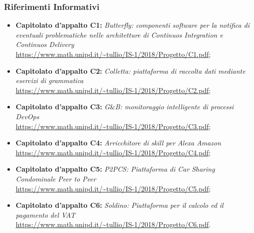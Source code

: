 \subsubsection{Riferimenti Informativi}
\begin{itemize}
	\item \textbf{Capitolato d'appalto C1:} \textit{Butterfly: componenti software per la notifica di eventuali problematiche nelle architetture di Continuos Integration e Continuos Delivery} \\
 		\url{https://www.math.unipd.it/~tullio/IS-1/2018/Progetto/C1.pdf};
 	\item \textbf{Capitolato d'appalto C2:} \textit{Colletta: piattaforma di raccolta dati mediante esercizi di grammatica} \\
		\url{https://www.math.unipd.it/~tullio/IS-1/2018/Progetto/C2.pdf};
	\item \textbf{Capitolato d'appalto C3:} \textit{G$\&$B: monitoraggio intelligente di processi DevOps} \\
		\url{https://www.math.unipd.it/~tullio/IS-1/2018/Progetto/C3.pdf};
	\item \textbf{Capitolato d'appalto C4:} \textit{Arricchitore di skill per Alexa Amazon} \\
		\url{https://www.math.unipd.it/~tullio/IS-1/2018/Progetto/C4.pdf};
	\item \textbf{Capitolato d'appalto C5:} \textit{P2PCS: Piattaforma di Car Sharing Condominale Peer to Peer} \\
		\url{https://www.math.unipd.it/~tullio/IS-1/2018/Progetto/C5.pdf};
	\item \textbf{Capitolato d'appalto C6:} \textit{Soldino: Piattaforma per il calcolo ed il pagamento del VAT} \\
		\url{https://www.math.unipd.it/~tullio/IS-1/2018/Progetto/C6.pdf}.
\end{itemize}